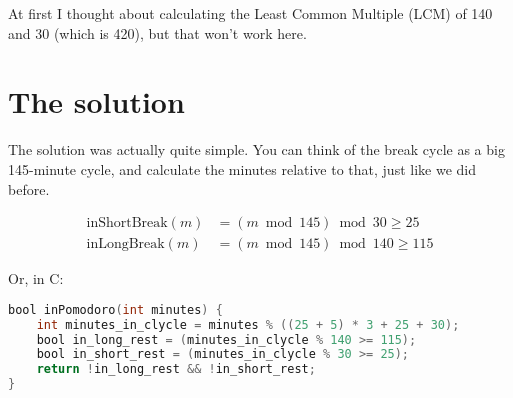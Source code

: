 \documentclass{amsart}
\begin{document}
At first I thought about calculating the Least Common Multiple (LCM) of 140 and
30 (which is 420), but that won't work here.

\section{The solution}

The solution was actually quite simple. You can think of the break cycle as a
big 145-minute cycle, and calculate the minutes relative to that, just like we
did before.

\begin{align*}
  \text{inShortBreak}(m) &= \left( m \bmod 145 \right) \bmod 30 \geq 25 \\
  \text{inLongBreak}(m)  &= \left( m \bmod 145 \right) \bmod 140 \geq 115
\end{align*}

Or, in C:

\begin{lstlisting}[language=C]
bool inPomodoro(int minutes) {
    int minutes_in_clycle = minutes % ((25 + 5) * 3 + 25 + 30);
    bool in_long_rest = (minutes_in_clycle % 140 >= 115);
    bool in_short_rest = (minutes_in_clycle % 30 >= 25);
    return !in_long_rest && !in_short_rest;
}
\end{lstlisting}
\end{document}

